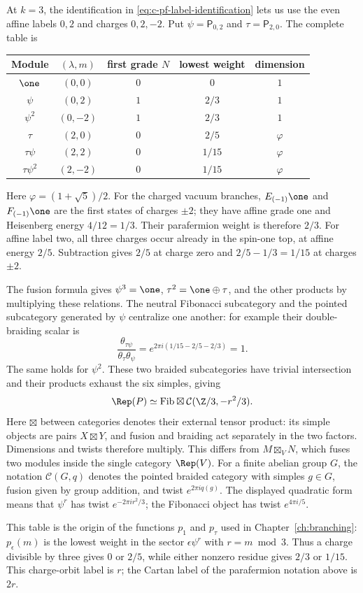 \begin{example}
\label{ex:c-potts-six-modules}
At $k=3$, the identification in
\eqref{eq:c-pf-label-identification} lets us use the even affine
labels $0,2$ and charges $0,2,-2$. Put
$\psi=\mathsf P_{0,2}$ and $\tau=\mathsf P_{2,0}$.
The complete table is
\begin{center}
\begin{tabular}{c|c|c|c|c}
Module & $(\lambda,m)$ & first grade $N$ & lowest weight & dimension\\
\hline
$\one$ & $(0,0)$ & $0$ & $0$ & $1$\\
$\psi$ & $(0,2)$ & $1$ & $2/3$ & $1$\\
$\psi^2$ & $(0,-2)$ & $1$ & $2/3$ & $1$\\
$\tau$ & $(2,0)$ & $0$ & $2/5$ & $\varphi$\\
$\tau\psi$ & $(2,2)$ & $0$ & $1/15$ & $\varphi$\\
$\tau\psi^2$ & $(2,-2)$ & $0$ & $1/15$ & $\varphi$
\end{tabular}
\end{center}
Here $\varphi=(1+\sqrt5)/2$. For the charged vacuum branches,
$E_{(-1)}\one$ and $F_{(-1)}\one$ are the first states of
charges $\pm2$; they have affine grade one and Heisenberg energy
$4/12=1/3$. Their parafermion weight is therefore $2/3$.
For affine label two, all three charges occur already in the
spin-one top, at affine energy $2/5$. Subtraction gives $2/5$
at charge zero and $2/5-1/3=1/15$ at charges $\pm2$.

The fusion formula gives
$\psi^3=\one$, $\tau^2=\one\oplus\tau$, and the other products
by multiplying these relations. The neutral Fibonacci subcategory
and the pointed subcategory generated by $\psi$ centralize one
another: for example their double-braiding scalar is
\[
 \frac{\theta_{\tau\psi}}{\theta_\tau\theta_\psi}
 =e^{2\pi i(1/15-2/5-2/3)}=1.
\]
The same holds for $\psi^2$. These two braided subcategories have
trivial intersection and their products exhaust the six simples,
giving
\[
 \Rep(P)\simeq\mathrm{Fib}\boxtimes
                  \mathcal C(\Z/3,-r^2/3).
\]
Here $\boxtimes$ between categories denotes their external tensor
product: its simple objects are pairs $X\boxtimes Y$, and fusion
and braiding act separately in the two factors. Dimensions and twists
therefore multiply. This differs from $M\boxtimes_V N$, which fuses
two modules inside the single category $\Rep(V)$.
For a finite abelian group $G$, the notation $\mathcal C(G,q)$ denotes
the pointed braided category with simples $g\in G$, fusion given by
group addition, and twist
$e^{2\pi i q(g)}$. The displayed quadratic form means that $\psi^r$ has twist
$e^{-2\pi i r^2/3}$; the Fibonacci object has twist $e^{4\pi i/5}$.

This table is the origin of the functions $p_1$ and $p_\tau$
used in Chapter~\ref{ch:branching}: $p_\epsilon(m)$ is the
lowest weight in the sector $\epsilon\psi^r$ with $r=m\bmod3$.
Thus a charge divisible by three gives $0$ or $2/5$, while either
nonzero residue gives $2/3$ or $1/15$. This charge-orbit label
is $r$; the Cartan label of the parafermion notation above is $2r$.
\end{example}

